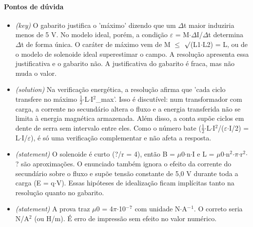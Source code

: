 \documentclass{article}%
\begin{document}
\paragraph{Pontos de dúvida}%
\begin{itemize}%
\item%
\textit{(key)} O gabarito justifica o 'máximo' dizendo que um $\Delta$t maior induziria menos de 5 V. No modelo ideal, porém, a condição $\varepsilon$ = M$\cdot$$\Delta$I/$\Delta$t determina $\Delta$t de forma única. O caráter de máximo vem de M $\leq$ $\surd$(L1$\cdot$L2) = L, ou de o modelo de solenoide ideal superestimar o campo. A resolução apresenta essa justificativa e o gabarito não. A justificativa do gabarito é fraca, mas não muda o valor.%
\item%
\textit{(solution)} Na verificação energética, a resolução afirma que 'cada ciclo transfere no máximo $\frac12$$\cdot$L$\cdot$I$^2$\_max'. Isso é discutível: num transformador com carga, a corrente no secundário altera o fluxo e a energia transferida não se limita à energia magnética armazenada. Além disso, a conta supõe ciclos em dente de serra sem intervalo entre eles. Como o número bate ($\frac12$$\cdot$L$\cdot$I$^2$/($\varepsilon$$\cdot$I/2) = L$\cdot$I/$\varepsilon$), é só uma verificação complementar e não afeta a resposta.%
\item%
\textit{(statement)} O solenoide é curto (?/r = 4), então B = $\mu$0$\cdot$n$\cdot$I e L = $\mu$0$\cdot$n$^2$$\cdot$$\pi$$\cdot$r$^2$$\cdot$? são aproximações. O enunciado também ignora o efeito da corrente do secundário sobre o fluxo e supõe tensão constante de 5,0 V durante toda a carga (E = q$\cdot$V). Essas hipóteses de idealização ficam implícitas tanto na resolução quanto no gabarito.%
\item%
\textit{(statement)} A prova traz $\mu$0 = 4$\pi$$\cdot$10$^{-}$$^{7}$ com unidade N$\cdot$A$^{-}$$^{1}$. O correto seria N/A$^2$ (ou H/m). É erro de impressão sem efeito no valor numérico.%
\end{itemize}%
\end{document}
